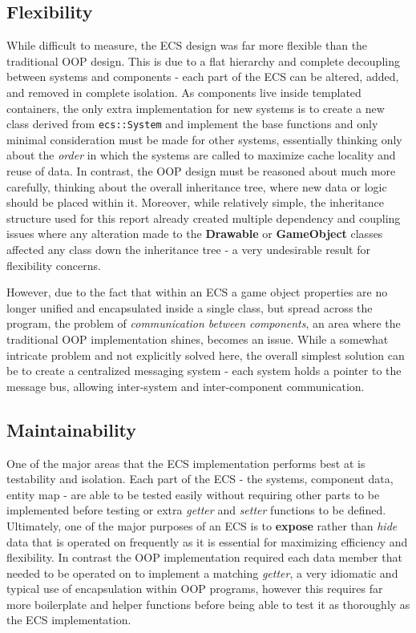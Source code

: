 \documentclass[10pt]{scrartcl}
\begin{document}
\subsection{Flexibility} %
\label{sub:flexibility}
While difficult to measure, the ECS design was far more flexible than the traditional OOP design. This is due to a flat hierarchy and complete decoupling between systems and components - each part of the ECS can be altered, added, and removed in complete isolation. As components live inside templated containers, the only extra implementation for new systems is to create a new class derived from \texttt{ecs::System} and implement the base functions and only minimal consideration must be made for other systems, essentially thinking only about the \textit{order} in which the systems are called to maximize cache locality and reuse of data. In contrast, the OOP design must be reasoned about much more carefully, thinking about the overall inheritance tree, where new data or logic should be placed within it. Moreover, while relatively simple, the inheritance structure used for this report already created multiple dependency and coupling issues where any alteration made to the \textbf{Drawable} or \textbf{GameObject} classes affected any class down the inheritance tree - a very undesirable result for flexibility concerns.

However, due to the fact that within an ECS a game object properties are no longer unified and encapsulated inside a single class, but spread across the program, the problem of \textit{communication between components}, an area where the traditional OOP implementation shines, becomes an issue. While a somewhat intricate problem and not explicitly solved here, the overall simplest solution can be to create a centralized messaging system - each system holds a pointer to the message bus, allowing inter-system and inter-component communication.

\subsection{Maintainability} %
\label{sub:maintainability}
One of the major areas that the ECS implementation performs best at is testability and isolation. Each part of the ECS - the systems, component data, entity map - are able to be tested easily without requiring other parts to be implemented before testing or extra \textit{getter} and \textit{setter} functions to be defined. Ultimately, one of the major purposes of an ECS is to \textbf{expose} rather than \textit{hide} data that is operated on frequently as it is essential for maximizing efficiency and flexibility. In contrast the OOP implementation required each data member that needed to be operated on to implement a matching \textit{getter}, a very idiomatic and typical use of encapsulation within OOP programs, however this requires far more boilerplate and helper functions before being able to test it as thoroughly as the ECS implementation.
\end{document}
